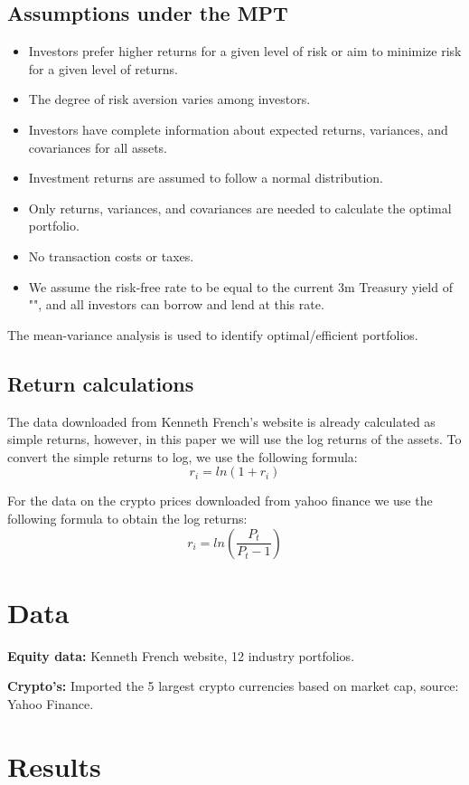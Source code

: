 \documentclass[12pt,a4paper]{article}
\begin{document}
\subsection{Assumptions under the MPT}
\begin{itemize}
\item Investors prefer higher returns for a given level of risk or aim to minimize risk for a given level of returns.
\item The degree of risk aversion varies among investors.
\item Investors have complete information about expected returns, variances, and covariances for all assets.
\item Investment returns are assumed to follow a normal distribution.
\item Only returns, variances, and covariances are needed to calculate the optimal portfolio.
\item No transaction costs or taxes.
\item We assume the risk-free rate to be equal to the current 3m Treasury yield of "", and all investors can borrow and lend at this rate. 
\end{itemize}
The mean-variance analysis is used to identify optimal/efficient portfolios.

\subsection{Return calculations}
The data downloaded from Kenneth French's website is already calculated as simple returns, however, in this paper we will use the log returns of the assets. To convert the simple returns to log, we use the following formula: 
$$r_i = ln(1+r_i)$$

\noindent For the data on the crypto prices downloaded from yahoo finance we use the following formula to obtain the log returns: 
$$r_i = ln(\frac{P_t}{P_t-1})$$

\section{Data}\label{sec:result}
\textbf{Equity data:} Kenneth French website, 12 industry portfolios. 

\noindent\textbf{Crypto's:} Imported the 5 largest crypto currencies based on market cap, source: Yahoo Finance.  

\section{Results}\label{sec:result}
\end{document}
